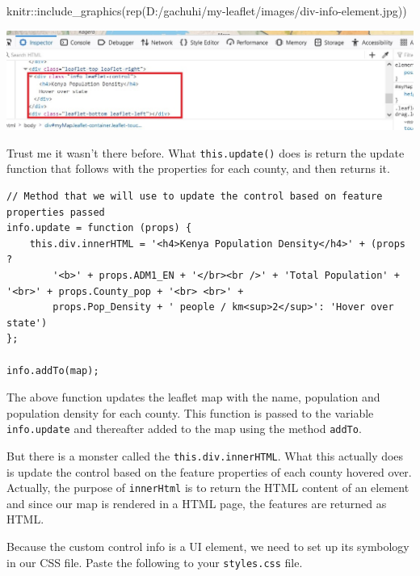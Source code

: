 \documentclass[
]{book}
\newenvironment{Shaded}{\begin{snugshade}}{\end{snugshade}}
\newcommand{\FunctionTok}[1]{\textcolor[rgb]{0.00,0.00,0.00}{#1}}
\newcommand{\NormalTok}[1]{#1}
\newcommand{\SpecialCharTok}[1]{\textcolor[rgb]{0.00,0.00,0.00}{#1}}
\newcommand{\StringTok}[1]{\textcolor[rgb]{0.31,0.60,0.02}{#1}}
\begin{document}
\begin{Shaded}
\begin{Highlighting}[]
\NormalTok{knitr}\SpecialCharTok{::}\FunctionTok{include\_graphics}\NormalTok{(}\FunctionTok{rep}\NormalTok{(}\StringTok{\textquotesingle{}D:/gachuhi/my{-}leaflet/images/div{-}info{-}element.jpg\textquotesingle{}}\NormalTok{))}
\end{Highlighting}
\end{Shaded}

\includegraphics[width=15.03in]{../images/div-info-element}

Trust me it wasn't there before. What \texttt{this.update()} does is return the update function that follows with the properties for each county, and then returns it.

\begin{verbatim}
// Method that we will use to update the control based on feature properties passed
info.update = function (props) {
    this.div.innerHTML = '<h4>Kenya Population Density</h4>' + (props ? 
        '<b>' + props.ADM1_EN + '</br><br />' + 'Total Population' + '<br>' + props.County_pop + '<br> <br>' + 
        props.Pop_Density + ' people / km<sup>2</sup>': 'Hover over state')
};

info.addTo(map);
\end{verbatim}

The above function updates the leaflet map with the name, population and population density for each county. This function is passed to the variable \texttt{info.update} and thereafter added to the map using the method \texttt{addTo}.

But there is a monster called the \texttt{this.div.innerHTML}. What this actually does is update the control based on the feature properties of each county hovered over. Actually, the purpose of \texttt{innerHtml} is to return the HTML content of an element and since our map is rendered in a HTML page, the features are returned as HTML.

Because the custom control info is a UI element, we need to set up its symbology in our CSS file. Paste the following to your \texttt{styles.css} file.
\end{document}
